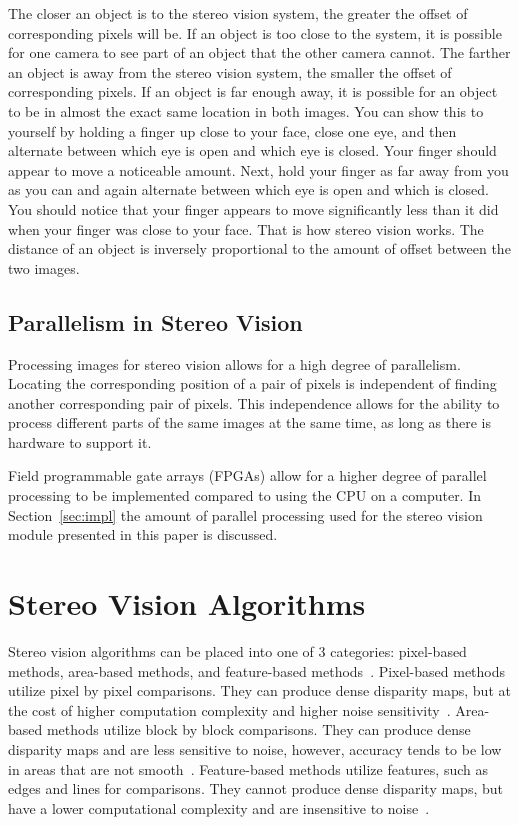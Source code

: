 The closer an object is to the stereo vision system, the greater the offset of corresponding pixels will be. If an object is too close to the system, it is possible for one camera to see part of an object that the other camera cannot. The farther an object is away from the stereo vision system, the smaller the offset of corresponding pixels. If an object is far enough away, it is possible for an object to be in almost the exact same location in both images. You can show this to yourself by holding a finger up close to your face, close one eye, and then alternate between which eye is open and which eye is closed. Your finger should appear to move a noticeable amount. Next, hold your finger as far away from you as you can and again alternate between which eye is open and which is closed. You should notice that your finger appears to move significantly less than it did when your finger was close to your face. That is how stereo vision works. The distance of an object is inversely proportional to the amount of offset between the two images.

\subsection{Parallelism in Stereo Vision}

Processing images for stereo vision allows for a high degree of parallelism. Locating the corresponding position of a pair of pixels is independent of finding another corresponding pair of pixels. This independence allows for the ability to process different parts of the same images at the same time, as long as there is hardware to support it.

Field programmable gate arrays (FPGAs) allow for a higher degree of parallel processing to be implemented compared to using the CPU on a computer. In Section~\ref{sec:impl} the amount of parallel processing used for the stereo vision module presented in this paper is discussed. 

\section{Stereo Vision Algorithms}

Stereo vision algorithms can be placed into one of 3 categories: pixel-based methods, area-based methods, and feature-based methods~\cite{xilinxSpartan3ABoard}. Pixel-based methods utilize pixel by pixel comparisons. They can produce dense disparity maps, but at the cost of higher computation complexity and higher noise sensitivity~\cite{xilinxSpartan3ABoard}. Area-based methods utilize block by block comparisons. They can produce dense disparity maps and are less sensitive to noise, however, accuracy tends to be low in areas that are not smooth~\cite{xilinxSpartan3ABoard}. Feature-based methods utilize features, such as edges and lines for comparisons. They cannot produce dense disparity maps, but have a lower computational complexity and are insensitive to noise~\cite{xilinxSpartan3ABoard}. 

